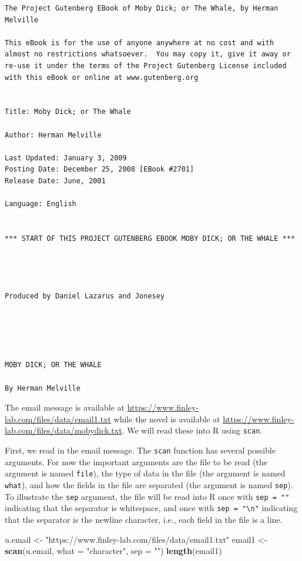 \documentclass[
]{krantz}
\makeatletter
\newenvironment{Shaded}{\begin{snugshade}}{\end{snugshade}}
\newcommand{\DataTypeTok}[1]{\textcolor[rgb]{0.27,0.27,0.27}{#1}}
\newcommand{\KeywordTok}[1]{\textcolor[rgb]{0.27,0.27,0.27}{\textbf{#1}}}
\newcommand{\NormalTok}[1]{#1}
\newcommand{\StringTok}[1]{\textcolor[rgb]{0.5,0.5,0.5}{#1}}
\newenvironment{kframe}{%
\medskip{}
\setlength{\fboxsep}{.8em}
 \def\at@end@of@kframe{}%
 \ifinner\ifhmode%
  \def\at@end@of@kframe{\end{minipage}}%
  \begin{minipage}{\columnwidth}%
 \fi\fi%
 \def\FrameCommand##1{\hskip\@totalleftmargin \hskip-\fboxsep
 \colorbox{shadecolor}{##1}\hskip-\fboxsep
     \hskip-\linewidth \hskip-\@totalleftmargin \hskip\columnwidth}%
 \MakeFramed {\advance\hsize-\width
   \@totalleftmargin\z@ \linewidth\hsize
   \@setminipage}}%
 {\par\unskip\endMakeFramed%
 \at@end@of@kframe}
\renewenvironment{Shaded}{\begin{kframe}}{\end{kframe}}
\makeatother
\begin{document}
\begin{verbatim}
The Project Gutenberg EBook of Moby Dick; or The Whale, by Herman Melville

This eBook is for the use of anyone anywhere at no cost and with
almost no restrictions whatsoever.  You may copy it, give it away or
re-use it under the terms of the Project Gutenberg License included
with this eBook or online at www.gutenberg.org


Title: Moby Dick; or The Whale

Author: Herman Melville

Last Updated: January 3, 2009
Posting Date: December 25, 2008 [EBook #2701]
Release Date: June, 2001

Language: English


*** START OF THIS PROJECT GUTENBERG EBOOK MOBY DICK; OR THE WHALE ***




Produced by Daniel Lazarus and Jonesey





MOBY DICK; OR THE WHALE

By Herman Melville
\end{verbatim}

The email message is available at \url{https://www.finley-lab.com/files/data/email1.txt} while the novel is available at \url{https://www.finley-lab.com/files/data/mobydick.txt}. We will read these into R using \texttt{scan}.

First, we read in the email message. The \texttt{scan} function has several possible arguments. For now the important arguments are the file to be read (the argument is named \texttt{file}), the type of data in the file (the argument is named \texttt{what}), and how the fields in the file are separated (the argument is named \texttt{sep}). To illustrate the \texttt{sep} argument, the file will be read into R once with \texttt{sep\ =\ ""} indicating that the separator is whitespace, and once with \texttt{sep\ =\ "\textbackslash{}n"} indicating that the separator is the newline character, i.e., each field in the file is a line.

\begin{Shaded}
\begin{Highlighting}[]
\NormalTok{u.email \textless{}{-}}\StringTok{ "https://www.finley{-}lab.com/files/data/email1.txt"}
\NormalTok{email1 \textless{}{-}}\StringTok{ }\KeywordTok{scan}\NormalTok{(u.email, }\DataTypeTok{what =} \StringTok{"character"}\NormalTok{, }\DataTypeTok{sep =} \StringTok{""}\NormalTok{)}
\KeywordTok{length}\NormalTok{(email1)}
\end{Highlighting}
\end{Shaded}
\end{document}
